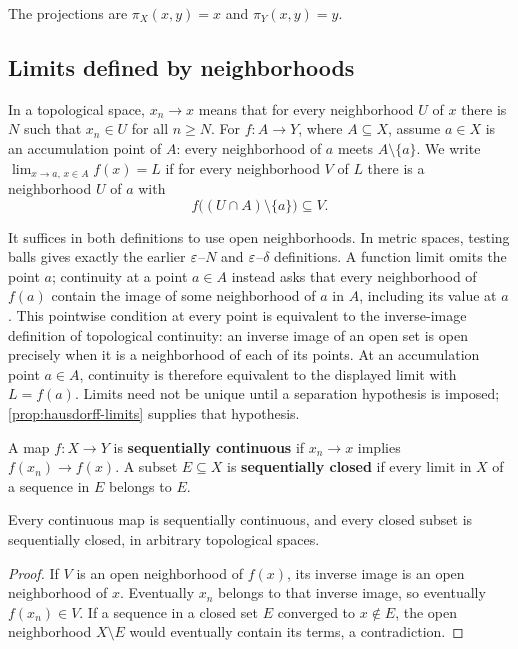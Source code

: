 The projections are $\pi_X(x,y)=x$ and $\pi_Y(x,y)=y$.
\subsection{Limits defined by neighborhoods}
\begin{definition}\label{def:topological-limits}
In a topological space, $x_n\to x$ means that for every neighborhood $U$
of $x$ there is $N$ such that $x_n\in U$ for all $n\geq N$.
For $f:A\to Y$, where $A\subseteq X$, assume $a\in X$ is an
accumulation point of $A$: every neighborhood of $a$ meets
$A\setminus\{a\}$. We write $\lim_{x\to a,\,x\in A}f(x)=L$ if for
every neighborhood $V$ of $L$ there is a neighborhood $U$ of $a$ with
\[
f\bigl((U\cap A)\setminus\{a\}\bigr)\subseteq V.
\]
\end{definition}
It suffices in both definitions to use open neighborhoods. In metric
spaces, testing balls gives exactly the earlier $\varepsilon$--$N$ and
$\varepsilon$--$\delta$ definitions. A function limit omits the point $a$;
continuity at a point $a\in A$ instead asks that every neighborhood of
$f(a)$ contain the image of some neighborhood of $a$ in $A$, including
its value at $a$. This pointwise condition at every point is equivalent
to the inverse-image definition of topological continuity: an inverse
image of an open set is open precisely when it is a neighborhood of
each of its points. At an accumulation point $a\in A$, continuity is
therefore equivalent to the displayed limit with $L=f(a)$.
Limits need not be unique until a separation hypothesis is imposed;
\cref{prop:hausdorff-limits} supplies that hypothesis.

\begin{definition}
\label{def:sequential-topology}
A map $f:X\to Y$ is \textbf{sequentially continuous} if
$x_n\to x$ implies $f(x_n)\to f(x)$. A subset $E\subseteq X$ is
\textbf{sequentially closed} if every limit in $X$ of a sequence in $E$
belongs to $E$.
\end{definition}
\begin{proposition}\label{prop:topological-sequential-implications}
Every continuous map is sequentially continuous, and every closed subset
is sequentially closed, in arbitrary topological spaces.
\end{proposition}
\begin{proof}
If $V$ is an open neighborhood of $f(x)$, its inverse image is an open
neighborhood of $x$. Eventually $x_n$ belongs to that inverse image, so
eventually $f(x_n)\in V$. If a sequence in a closed set $E$ converged to
$x\notin E$, the open neighborhood $X\setminus E$ would eventually
contain its terms, a contradiction.
\end{proof}

